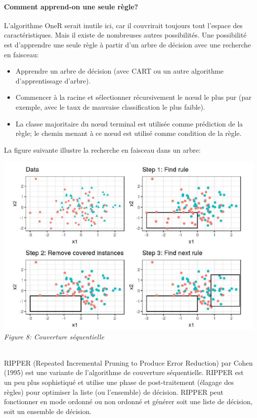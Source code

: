 \paragraph{Comment apprend-on une seule règle?}
 L'algorithme OneR serait inutile ici, car il couvrirait toujours tout l'espace des caractéristiques. Mais il existe de nombreuses autres possibilités. Une possibilité est d'apprendre une seule règle à partir d'un arbre de décision avec une recherche en faisceau:
\begin{itemize}
    \item Apprendre un arbre de décision (avec CART ou un autre algorithme d'apprentissage d'arbre).
    \item Commencer à la racine et sélectionner récursivement le nœud le plus pur (par exemple, avec le taux de mauvaise classification le plus faible).
    \item La classe majoritaire du nœud terminal est utilisée comme prédiction de la règle; le chemin menant à ce nœud est utilisé comme condition de la règle.
\end{itemize}
La figure suivante illustre la recherche en faisceau dans un arbre:

\begin{center}
    \centering
    \includegraphics[width=0.7\linewidth]{Images/rule_elimantion.png}
    \\
    \emph{Figure 8: Couverture séquentielle}
    \\
\end{center}
\\
RIPPER (Repeated Incremental Pruning to Produce Error Reduction) par Cohen (1995) est une variante de l'algorithme de couverture séquentielle. RIPPER est un peu plus sophistiqué et utilise une phase de post-traitement (élagage des règles) pour optimiser la liste (ou l'ensemble) de décision. RIPPER peut fonctionner en mode ordonné ou non ordonné et générer soit une liste de décision, soit un ensemble de décision.


